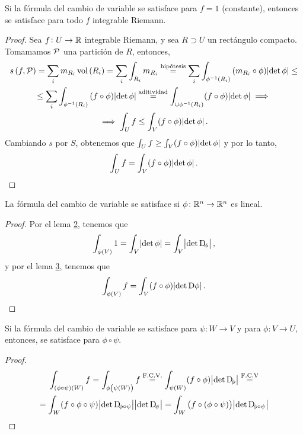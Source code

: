\begin{lema}[(3)]\label{lema:tres_cambio}
    Si la fórmula del cambio de variable se satisface para $f = 1$ (constante), entonces se satisface para todo $f$ integrable Riemann.
\end{lema}

\begin{proof}
    Sea $f \colon U \to \mathbb{R}$ integrable Riemann, y sea $R \supset U$ un rectángulo compacto. Tomamamos $\mathcal{P}$ una partición de $R$, entonces,
    \begin{gather*}
        s\left( f, \mathcal{P} \right) = \sum_i m_{R_i} \operatorname{vol}\left( R_i \right) = \sum_{i} \int_{R_i} m_{R_i} \stackrel{\text{hipótesis}}{=}
        \sum_i \int_{\phi^{-1}\left( R_i \right)} \left( m_{R_i} \circ \phi \right)\abs{\det\phi} \leq \\ \leq
        \sum_i \int_{\phi^{-1}\left( R_i \right)} \left( f \circ \phi \right) \abs{\det\phi} \stackrel{\text{aditividad}}{=}
        \int_{\cup \phi^{-1}\left( R_i \right)} (f \circ \phi) \abs{\det \phi} \implies \\ \implies
        \int_U f \leq \int_V (f \circ \phi) \abs{\det \phi}.
    \end{gather*}
    Cambiando $s$ por $S$, obtenemos que $\int_U f \geq \int_V (f \circ \phi) \abs{\det\phi}$ y por lo tanto,
    \[
        \int_U f = \int_V (f \circ \phi) \abs{\det \phi}.
    \]
\end{proof}

\begin{lema}[(4)]\label{lema:cuatro_cambio}
    La fórmula del cambio de variable se satisface si $\phi \colon \mathbb{R}^n \to \mathbb{R}^n$ es lineal.
\end{lema}
\begin{proof}
    Por el lema \hyperref[lema:dos_cambio]{2}, tenemos que
    \[
        \int_{\phi(V)} 1 = \int_V \abs{\det \phi} = \int_V \abs{\det \Dif_\phi},
    \]
    y por el lema \hyperref[lema:tres_cambio]{3}, tenemos que
    \[
        \int_{\phi(V)} f = \int_V (f \circ \phi) \abs{\det \Dif \phi}.
    \]
\end{proof}

\begin{lema}[(5)]\label{lema:cinco_cambio}
    Si la fórmula del cambio de variable se satisface para $\psi \colon W \to V$ y para $\phi \colon V \to U$, entonces, se satisface para
    $\phi \circ \psi$.
\end{lema}

\begin{proof}
    \begin{gather*}
        \int_{(\phi \circ \psi)(W)} f = \int_{\phi\left( \psi(W) \right)} f \stackrel{\text{F.C.V.}}{=} \int_{\psi(W)} (f \circ \phi)
        \abs{\det \Dif_\phi} \stackrel{\text{F.C.V}}{=} \\ = \int_W (f \circ \phi \circ \psi) \abs{\det \Dif_{\phi \circ \psi}} \abs{\det \Dif_\psi} =
        \int_W \left( f \circ ( \phi \circ \psi) \right) \abs{\det \Dif_{\phi \circ \psi}}
    \end{gather*}
\end{proof}

